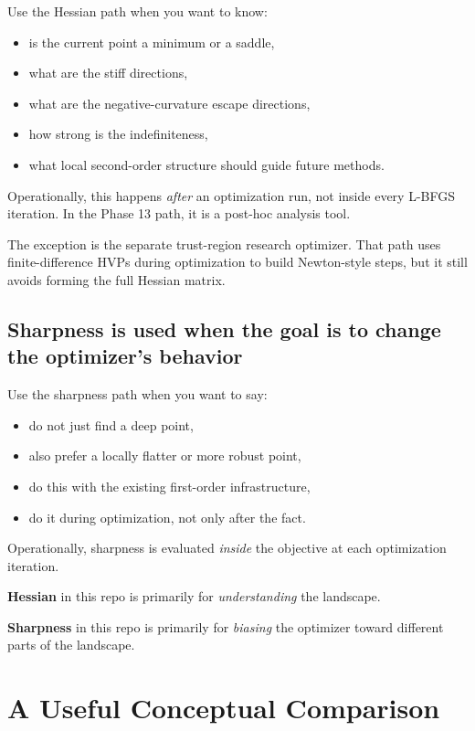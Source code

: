 \documentclass[11pt,letterpaper]{article}
\begin{document}
Use the Hessian path when you want to know:
\begin{itemize}[leftmargin=*]
  \item is the current point a minimum or a saddle,
  \item what are the stiff directions,
  \item what are the negative-curvature escape directions,
  \item how strong is the indefiniteness,
  \item what local second-order structure should guide future methods.
\end{itemize}

Operationally, this happens \emph{after} an optimization run, not inside every
L-BFGS iteration. In the Phase 13 path, it is a post-hoc analysis tool.

The exception is the separate trust-region research optimizer. That path uses
finite-difference HVPs during optimization to build Newton-style steps, but it
still avoids forming the full Hessian matrix.

\subsection{Sharpness is used when the goal is to change the optimizer's
behavior}

Use the sharpness path when you want to say:
\begin{itemize}[leftmargin=*]
  \item do not just find a deep point,
  \item also prefer a locally flatter or more robust point,
  \item do this with the existing first-order infrastructure,
  \item do it during optimization, not only after the fact.
\end{itemize}

Operationally, sharpness is evaluated \emph{inside} the objective at each
optimization iteration.

\begin{takeaway}
\textbf{Hessian} in this repo is primarily for \emph{understanding} the
landscape.

\textbf{Sharpness} in this repo is primarily for \emph{biasing} the optimizer
toward different parts of the landscape.
\end{takeaway}

\section{A Useful Conceptual Comparison}
\end{document}
